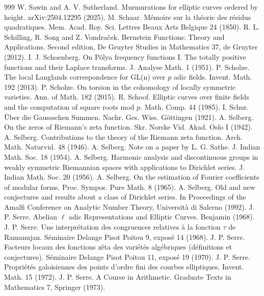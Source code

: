 \begin{thebibliography}{999}
 W. Sawin and A. V. Sutherland. Murmurations for elliptic curves ordered by height. arXiv:2504.12295 (2025).
 M. Schaar. M\'emoire sur la th\'eorie des r\'esidus quadratiques. Mem. Acad. Roy. Sci. Lettres Beaux Arts Belgique 24 (1850).
 R. L. Schilling, R. Song and Z. Vondra\v{c}ek. Bernstein Functions: Theory and Applications. Second edition, De Gruyter Studies in Mathematics 37, de Gruyter (2012).
 I. J. Schoenberg. On P\'olya frequency functions I. The totally positive functions and their Laplace transforms. J. Analyse Math. 1 (1951).
 P. Scholze. The local Langlands correspondence for GL(n) over $p$ adic fields. Invent. Math. 192 (2013).
 P. Scholze. On torsion in the cohomology of locally symmetric varieties. Ann. of Math. 182 (2015).
 R. Schoof. Elliptic curves over finite fields and the computation of square roots mod $p$. Math. Comp. 44 (1985).
 I. Schur. \"Uber die Gaussschen Summen. Nachr. Ges. Wiss. G\"ottingen (1921).
 A. Selberg. On the zeros of Riemann's zeta function. Skr. Norske Vid. Akad. Oslo I (1942).
 A. Selberg. Contributions to the theory of the Riemann zeta function. Arch. Math. Naturvid. 48 (1946).
 A. Selberg. Note on a paper by L. G. Sathe. J. Indian Math. Soc. 18 (1954).
 A. Selberg. Harmonic analysis and discontinuous groups in weakly symmetric Riemannian spaces with applications to Dirichlet series. J. Indian Math. Soc. 20 (1956).
 A. Selberg. On the estimation of Fourier coefficients of modular forms. Proc. Sympos. Pure Math. 8 (1965).
 A. Selberg. Old and new conjectures and results about a class of Dirichlet series. In Proceedings of the Amalfi Conference on Analytic Number Theory, Universit\`a di Salerno (1992).
 J. P. Serre. Abelian $\ell$ adic Representations and Elliptic Curves. Benjamin (1968).
 J. P. Serre. Une interpr\'etation des congruences relatives \`a la fonction $\tau$ de Ramanujan. S\'eminaire Delange Pisot Poitou 9, expos\'e 14 (1968).
 J. P. Serre. Facteurs locaux des fonctions z\^eta des vari\'et\'es alg\'ebriques (d\'efinitions et conjectures). S\'eminaire Delange Pisot Poitou 11, expos\'e 19 (1970).
 J. P. Serre. Propri\'et\'es galoisiennes des points d'ordre fini des courbes elliptiques. Invent. Math. 15 (1972).
 J. P. Serre. A Course in Arithmetic. Graduate Texts in Mathematics 7, Springer (1973).

\end{thebibliography}

